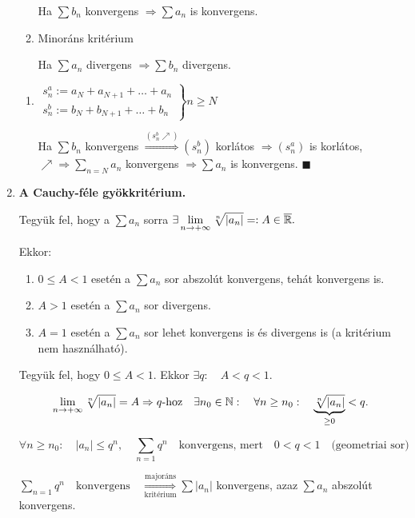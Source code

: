 \documentclass[a4paper,11.5pt]{article}
\begin{document}
\begin{enumerate}
\begin{enumerate}
			Ha $\sum b_n$ konvergens $\Rightarrow \sum a_n$ is konvergens.
			
			\item Minoráns kritérium
			
			Ha $\sum a_n$ divergens $\Rightarrow \sum b_n$ divergens.
		\end{enumerate}
		
		\biz 
		\begin{enumerate}
			\item $\left.
			\begin{gathered}
				s_n^a:=a_N+a_{N+1}+\ldots +a_n\\
				s_n^b:=b_N+b_{N+1}+\ldots+b_n
			\end{gathered}\right\}n\geq N$
			
			Ha $\sum b_n$ konvergens $\overset{(s_n^b\nearrow)}{\Longrightarrow}(s_n^b)$ korlátos $\Rightarrow (s_n^a)$ is korlátos, $\nearrow\Rightarrow\displaystyle\sum_{n=N}a_n$ konvergens $\Rightarrow \sum a_n$ is konvergens. \quad$\blacksquare$
		\end{enumerate}
		
		\item \textbf{A Cauchy-féle gyökkritérium.}
		
		Tegyük fel, hogy a $\sum a_n$ sorra $\exists\displaystyle\lim_{n\to +\infty} \sqrt[n]{|a_n|}=:A\in \overline{\mathbb{R}}.$
		
		Ekkor:
		\begin{enumerate}
			\item $0 \leq A <1$ esetén a $\sum a_n$ sor abszolút konvergens, tehát konvergens is.
			\item $A>1$ esetén a $\sum a_n$ sor divergens.
			\item $A=1$ esetén a $\sum a_n$ sor lehet konvergens is és divergens is (a kritérium nem használható).
		\end{enumerate}
		
		\biz Tegyük fel, hogy $0\leq A<1$. Ekkor $\exists q:\quad A<q<1$.
		
		\[\displaystyle\lim_{n\to +\infty}\sqrt[n]{|a_n|}=A \Rightarrow q\text{-hoz} \quad  \exists n_0 \in \mathbb{N}: \quad\forall n \geq n_0: \quad\underbrace{\sqrt[n]{|a_n|}}_{\geq 0}<q.\]
		
		\[ \forall n\geq n_0: \quad|a_n|\leq q^n,\quad  \sum_{n=1}q^n \quad\text{konvergens, mert}\quad 0<q<1 \quad \text{(geometriai sor)} \]
		
		$\displaystyle\sum_{n=1} q^n \quad\text{konvergens} \quad\overset{\text{majoráns}}{\underset{\text{kritérium}}{\Longrightarrow}} \sum |a_n| $ konvergens, azaz $\displaystyle\sum a_n$ abszolút konvergens.\\
		

\end{enumerate}
\end{document}
